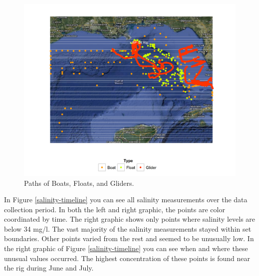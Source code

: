 \documentclass[authoryear,12pt]{elsarticle}
\begin{document}
\begin{figure}[htbp] %
   \centering
   \includegraphics[width=5in]{boats-floats-gliders.png} 
   \caption{Paths of Boats, Floats, and Gliders. }
   \label{Boats, Floats and Gliders}
\end{figure}
In Figure \ref {salinity-timeline} you can see all salinity measurements over the data collection period. In both the left and right graphic, the points are color coordinated by time. The right graphic shows only points where salinity levels are below 34 mg/l. The vast majority of the salinity measurements stayed within set boundaries. Other points varied from the rest and seemed to be unusually low. In the right graphic of Figure \ref {salinity-timeline} you can see when and where these unusual values occurred. The highest concentration of these points is found near the rig during June and July.
\end{document}

